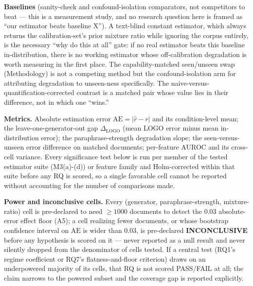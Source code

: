 \documentclass[11pt]{article}
\begin{document}
\textbf{Baselines} (sanity-check and confound-isolation comparators, not competitors to beat --- this is a measurement study, and no research question here is framed as ``our estimator beats baseline X''). A text-blind constant estimator, which always returns the calibration-set's prior mixture ratio while ignoring the corpus entirely, is the necessary ``why do this at all'' gate: if no real estimator beats this baseline in-distribution, there is no working estimator whose off-calibration degradation is worth measuring in the first place. The capability-matched seen/unseen swap (Methodology) is not a competing method but the confound-isolation arm for attributing degradation to unseen-ness specifically. The naive-versus-quantification-corrected contrast is a matched pair whose value lies in their difference, not in which one ``wins.''

\textbf{Metrics.} Absolute estimation error $\mathrm{AE} = |\hat{r} - r|$ and its condition-level mean; the leave-one-generator-out gap $\Delta_{\text{LOGO}}$ (mean LOGO error minus mean in-distribution error); the paraphrase-strength degradation slope; the seen-versus-unseen error difference on matched documents; per-feature AUROC and its cross-cell variance. Every significance test below is run per member of the tested estimator suite (M3(a)-(d)) or feature family and Holm-corrected within that suite before any RQ is scored, so a single favorable cell cannot be reported without accounting for the number of comparisons made.

\textbf{Power and inconclusive cells.} Every (generator, paraphrase-strength, mixture-ratio) cell is pre-declared to need $\geq 1000$ documents to detect the 0.03 absolute-error effect floor (A5); a cell realizing fewer documents, or whose bootstrap confidence interval on $\mathrm{AE}$ is wider than 0.03, is pre-declared \textbf{INCONCLUSIVE} before any hypothesis is scored on it --- never reported as a null result and never silently dropped from the denominator of cells tested. If a central test (RQ1's regime coefficient or RQ7's flatness-and-floor criterion) draws on an underpowered majority of its cells, that RQ is not scored PASS/FAIL at all; the claim narrows to the powered subset and the coverage gap is reported explicitly.
\end{document}

